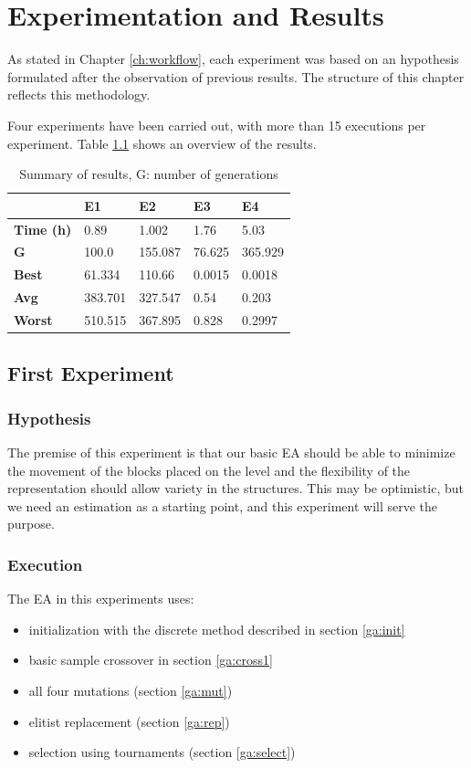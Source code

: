 \chapter{Experimentation and Results}\label{ch:res}
As stated in Chapter \ref{ch:workflow}, each experiment was based on an hypothesis formulated after the observation of previous results. The structure of this chapter reflects this methodology.

Four experiments have been carried out, with more than 15 executions per experiment. Table \ref{t:resOver} shows an overview of the results.
\begin{table}[H]
	\myfloatalign
	\begin{tabularx}{\textwidth}{XXXXX} \toprule
		& \textbf{E1} & \textbf{E2} & \textbf{E3} &\textbf{E4} \\ \midrule
		\textbf{Time (h)} & 0.89 & 1.002 & 1.76 & 5.03 \\ \midrule
		\textbf{G} &  100.0 & 155.087 & 76.625 & 365.929 \\ \midrule
		\textbf{Best} & 61.334 & 110.66 & 0.0015 & 0.0018 \\ \midrule
		\textbf{Avg} & 383.701 & 327.547 & 0.54 &  0.203 \\ \midrule
		\textbf{Worst}  & 510.515 & 367.895 & 0.828 & 0.2997\\ \midrule

		\bottomrule
	\end{tabularx}
	\caption{Summary of results, G: number of generations}
	\label{t:resOver}
\end{table}

\section{First Experiment}
\subsection{Hypothesis}
The premise of this experiment is that our basic \acs{EA} should be able to minimize the movement of the blocks placed on the level and the flexibility of the representation should allow variety in the structures. This may be optimistic, but we need an estimation as a starting point, and this experiment will serve the purpose. 
\subsection{Execution}
The \acs{EA} in this experiments uses:
\begin{itemize}
	\item  initialization with the discrete method described in section \ref{ga:init}
	\item  basic sample crossover in section \ref{ga:cross1}
	\item  all four mutations (section \ref{ga:mut})
	\item  elitist replacement (section \ref{ga:rep})
	\item  selection using tournaments (section \ref{ga:select})
\end{itemize}

